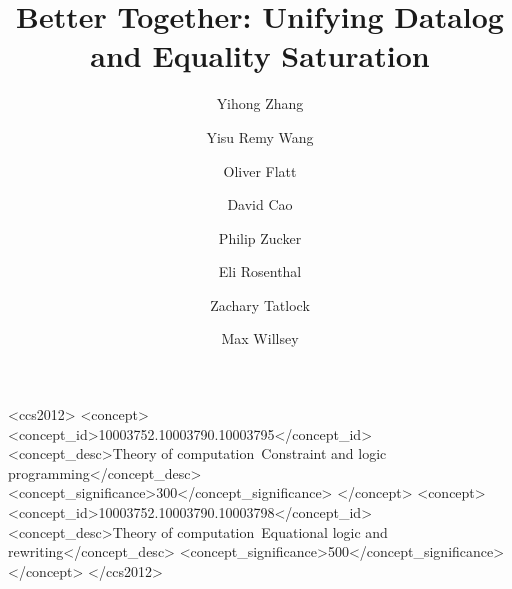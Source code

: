 \documentclass[acmsmall,screen,nonacm]{acmart}
\begin{document}
\title{Better Together: Unifying Datalog and Equality Saturation}



\author{Yihong Zhang}
\author{Yisu Remy Wang}
\author{Oliver Flatt}
\author{David Cao}
\author{Philip Zucker}
\author{Eli Rosenthal}
\author{Zachary Tatlock}
\author{Max Willsey}

\begin{abstract}
  
\end{abstract}


\begin{CCSXML}
  <ccs2012>
     <concept>
         <concept_id>10003752.10003790.10003795</concept_id>
         <concept_desc>Theory of computation~Constraint and logic programming</concept_desc>
         <concept_significance>300</concept_significance>
         </concept>
     <concept>
         <concept_id>10003752.10003790.10003798</concept_id>
         <concept_desc>Theory of computation~Equational logic and rewriting</concept_desc>
         <concept_significance>500</concept_significance>
         </concept>
   </ccs2012>
\end{CCSXML}
  
\end{document}

